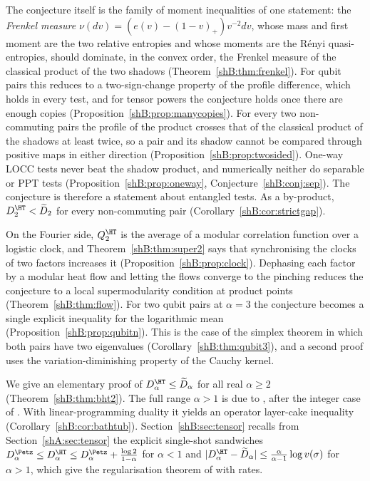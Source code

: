 The conjecture itself is the family of moment inequalities of one statement: the \emph{Frenkel measure} $\nu(dv)=(e(v)-(1-v)_+)v^{-2}dv$, whose mass and first moment are the two relative entropies and whose moments are the R\'enyi quasi-entropies, should dominate, in the convex order, the Frenkel measure of the classical product of the two shadows (Theorem~\ref{shB:thm:frenkel}). For qubit pairs this reduces to a two-sign-change property of the profile difference, which holds in every test, and for tensor powers the conjecture holds once there are enough copies (Proposition~\ref{shB:prop:manycopies}). For every two non-commuting pairs the profile of the product crosses that of the classical product of the shadows at least twice, so a pair and its shadow cannot be compared through positive maps in either direction (Proposition~\ref{shB:prop:twosided}). One-way LOCC tests never beat the shadow product, and numerically neither do separable or PPT tests (Proposition~\ref{shB:prop:oneway}, Conjecture~\ref{shB:conj:sep}). The conjecture is therefore a statement about entangled tests. As a by-product, $D^\HT_2<\widetilde D_2$ for every non-commuting pair (Corollary~\ref{shB:cor:strictgap}).

On the Fourier side, $Q^\HT_2$ is the average of a modular correlation function over a logistic clock, and Theorem~\ref{shB:thm:super2} says that synchronising the clocks of two factors increases it (Proposition~\ref{shB:prop:clock}). Dephasing each factor by a modular heat flow and letting the flows converge to the pinching reduces the conjecture to a local supermodularity condition at product points (Theorem~\ref{shB:thm:flow}). For two qubit pairs at $\alpha=3$ the conjecture becomes a single explicit inequality for the logarithmic mean (Proposition~\ref{shB:prop:qubitn}). This is the case of the simplex theorem in which both pairs have two eigenvalues (Corollary~\ref{shB:thm:qubit3}), and a second proof uses the variation-diminishing property of the Cauchy kernel.

We give an elementary proof of $D^\HT_\alpha\le\widetilde D_\alpha$ for all real $\alpha\ge2$ (Theorem~\ref{shB:thm:bht2}). The full range $\alpha>1$ is due to \cite{LiuHircheCheng2025}, after the integer case of \cite{BeigiHircheTomamichel2025}. With linear-programming duality it yields an operator layer-cake inequality (Corollary~\ref{shB:cor:bathtub}). Section~\ref{shB:sec:tensor} recalls from Section~\ref{shA:sec:tensor} the explicit single-shot sandwiches $D^\Petz_\alpha\le D^\HT_\alpha\le D^\Petz_\alpha+\frac{\log 2}{1-\alpha}$ for $\alpha<1$ and $|D^\HT_\alpha-\widetilde D_\alpha|\le\frac{\alpha}{\alpha-1}\log v(\sigma)$ for $\alpha>1$, which give the regularisation theorem of \cite{HircheTomamichel2024} with rates.

